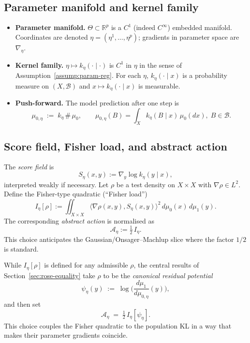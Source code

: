 \subsection{Parameter manifold and kernel family}
\label{subsec:param-kernel}

\begin{itemize}
    \item \textbf{Parameter manifold.} $\Theta\subset\mathbb R^p$ is a $C^1$ (indeed $C^\infty$) embedded manifold.  Coordinates are denoted $\eta=(\eta^1,\dots,\eta^p)$; gradients in parameter space are $\nabla_\eta$.
    \item \textbf{Kernel family.} $\eta\mapsto k_\eta(\cdot\mid\cdot)$ is $C^1$ in $\eta$ in the sense of Assumption~\ref{assump:param-reg}.  For each $\eta$, $k_\eta(\cdot\mid x)$ is a probability measure on $(X,\mathcal B)$ and $x\mapsto k_\eta(\cdot\mid x)$ is measurable.
    \item \textbf{Push-forward.} The model prediction after one step is
    \[
        \mu_{0,\eta} \;:=\; k_\eta\,\#\,\mu_0,
        \qquad \mu_{0,\eta}(B) = \int_X k_\eta(B\mid x)\,\mu_0(dx),\; B\in\mathcal B.
    \]
\end{itemize}

\subsection{Score field, Fisher load, and abstract action}
\label{subsec:score-fisher-action}

The \emph{score field} is
\[
    S_\eta(x,y) := \nabla_y \log k_\eta(y\mid x),
\]
interpreted weakly if necessary.  Let $\rho$ be a test density on $X\times X$ with $\nabla\rho\in L^2$.  Define the Fisher-type quadratic (``Fisher load'')
\begin{equation}
    I_\eta[\rho]
      := \iint_{X\times X} \big\langle \nabla\rho(x,y), S_\eta(x,y)\big\rangle^2\,d\mu_0(x)\,d\mu_1(y).
      \label{eq:Fisher-load}
\end{equation}
The corresponding \emph{abstract action} is normalised as
\begin{equation}
    \mathcal A_\eta := \tfrac12\,I_\eta.
    \label{eq:abstract-action}
\end{equation}
This choice anticipates the Gaussian/Onsager--Machlup slice where the factor $1/2$ is standard.

\begin{remark}
\label{rem:canonical-A}
While $I_\eta[\rho]$ is defined for any admissible $\rho$, the central results of Section~\ref{sec:rose-equality} take $\rho$ to be the \emph{canonical residual potential}
\[
    \psi_\eta(y) \;:=\; \log\!\Big(\frac{d\mu_1}{d\mu_{0,\eta}}(y)\Big),
\]
and then set
\[
    \mathcal A_\eta \;=\; \tfrac12\, I_\eta[\psi_\eta].
\]
This choice couples the Fisher quadratic to the population KL in a way that makes their parameter gradients coincide.
\end{remark}

